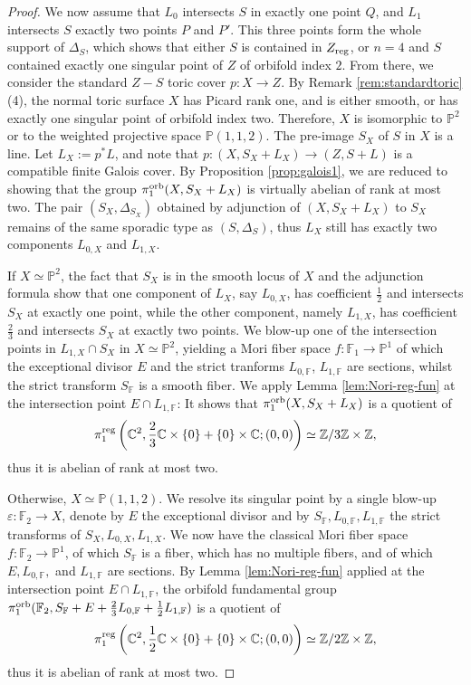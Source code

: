 \documentclass{amsart}
\newcommand{\pp}{\mathbb{P}}
\newcommand{\zz}{\mathbb{Z}}
\newcommand{\cc}{\mathbb{C}}
\theoremstyle{definition}
\theoremstyle{remark}
\numberwithin{equation}{section}
\begin{document}
\begin{proof}
\medskip

We now assume that $L_0$ intersects $S$ in exactly one point $Q$, and $L_1$ intersects $S$ exactly two points $P$ and $P'$.
This three points form the whole support of $\Delta_S$, which shows that either $S$ is contained in $Z_{\rm reg}$, or $n=4$ and $S$ contained exactly one singular point of $Z$ of orbifold index $2$.
From there, we consider the standard $Z - S$ toric cover $p:X\to Z$. By Remark \ref{rem:standardtoric}(4), the normal toric surface $X$ has Picard rank one, and is either smooth, or has exactly one singular point of orbifold index two. Therefore, $X$ is isomorphic to $\pp^2$ or to the weighted projective space $\pp(1,1,2)$. The pre-image $S_X$ of $S$ in $X$ is a line. Let $L_X:=p^*L$, and note that $p:(X,S_X+L_X)\to (Z,S+L)$ is a compatible finite Galois cover. By Proposition \ref{prop:galois1}, we are reduced to showing that the group $\pi_1^{\rm orb}(X,S_X+L_X)$ is virtually abelian of rank at most two.
The pair $(S_X,\Delta_{S_X})$ obtained by adjunction of $(X,S_X+L_X)$ to $S_X$ remains of the same sporadic type as $(S,\Delta_S)$, thus $L_X$ still has exactly two components $L_{0,X}$ and $L_{1,X}$.

If $X\simeq \pp^2$, the fact that $S_X$ is in the smooth locus of $X$ and the adjunction formula show that one component of $L_X$, say $L_{0,X}$, has coefficient $\frac{1}{2}$ and intersects $S_X$ at exactly one point, while the other component, namely $L_{1,X}$, has coefficient $\frac{2}{3}$ and intersects $S_X$ at exactly two points.
We blow-up one of the intersection points in $L_{1,X}\cap S_X$ in $X\simeq\pp^2$, yielding a Mori fiber space $f:\mathbb{F}_1\to \pp^1$ of which the exceptional divisor $E$ and the strict tranforms $L_{0,\mathbb{F}}$, $L_{1,\mathbb{F}}$ are sections, whilst the strict transform $S_{\mathbb{F}}$ is a smooth fiber. We apply Lemma \ref{lem:Nori-reg-fun} at the intersection point $E\cap L_{1,\mathbb{F}}$: It shows that $\pi_1^{\rm orb}(X,S_X+L_X)$ is a quotient of 
$$\pi_1^{\rm reg}\left(\cc^2,\frac{2}{3}\cc\times \{0\} + \{0\}\times \cc;(0,0)\right)\simeq \zz/3\zz\times\zz,$$
thus it is abelian of rank at most two.

Otherwise, $X\simeq \pp(1,1,2)$. We resolve its singular point by a single blow-up $\varepsilon: \mathbb{F}_2\to X$, denote by $E$ the exceptional divisor and by $S_{\mathbb{F}},L_{0,\mathbb{F}},L_{1,\mathbb{F}}$ the strict transforms of $S_X,L_{0,X},L_{1,X}$. We now have the classical Mori fiber space $f:\mathbb{F}_2\to \pp^1$, of which $S_{\mathbb{F}}$ is a fiber, which has no multiple fibers, and of which $E,L_{0,\mathbb{F}},$ and $L_{1,\mathbb{F}}$ are sections. By Lemma \ref{lem:Nori-reg-fun} applied at the intersection point $E\cap L_{1,\mathbb{F}}$, the orbifold fundamental group $\pi_1^{\rm orb}(\mathbb{F}_2,S_{\mathbb{F}}+E+\frac{2}{3}L_{0,\mathbb{F}}+\frac{1}{2}L_{1,\mathbb{F}})$ is a quotient of 
$$\pi_1^{\rm reg}\left(\cc^2,\frac{1}{2}\cc\times \{0\} + \{0\}\times \cc;(0,0)\right)\simeq \zz/2\zz\times\zz,$$
thus it is abelian of rank at most two.


\end{proof}
\end{document}
